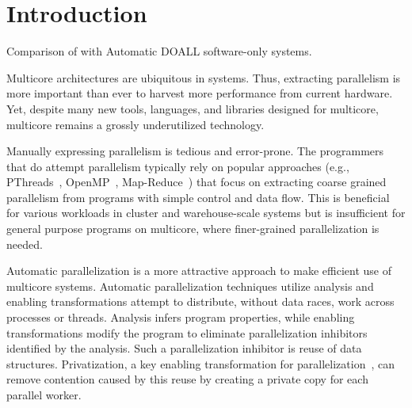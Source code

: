 \section{Introduction}

\begin{table*}[t]
  
  \caption{
    Comparison of \name with Automatic DOALL software-only systems.
  }
  \label{tab:related-work}
    \vspace{-5pt}
\end{table*}

Multicore architectures are ubiquitous in systems.  Thus, extracting
parallelism is more important than ever to harvest more performance
from current hardware.
%
Yet, despite many new tools, languages, and libraries designed for
multicore, multicore remains a grossly underutilized technology.

%
Manually expressing parallelism is tedious and error-prone. The
programmers that do attempt parallelism typically rely on popular
approaches (e.g., PThreads~\cite{pthread:web},
OpenMP~\cite{openmp:web}, Map-Reduce~\cite{dean:08:cacm}) that focus
on extracting coarse grained parallelism from programs with simple
control and data flow. This is beneficial for various workloads in
cluster and warehouse-scale systems but is insufficient for general
purpose programs on multicore, where finer-grained parallelization is
needed.

%


Automatic parallelization is a more attractive approach to make
efficient use of multicore systems.
%
Automatic parallelization techniques utilize analysis and enabling
transformations attempt to distribute, without data races, work across
processes or threads.
%
Analysis infers program properties, while enabling transformations
modify the program to eliminate parallelization inhibitors identified
by the analysis.
%
Such a parallelization inhibitor is reuse of data structures.
Privatization, a key enabling transformation for
parallelization~\cite{citations_from_privateer}, can remove contention
caused by this reuse by creating a private copy for each parallel
worker.

